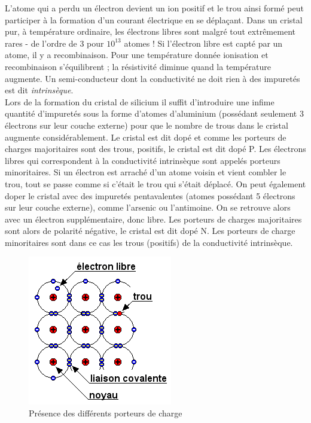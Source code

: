 L'atome qui a perdu un électron devient un ion positif et le trou ainsi formé peut participer à la formation d'un courant électrique en se déplaçant.
Dans un cristal pur, à température ordinaire, les électrons libres sont malgré tout extrêmement rares - de l'ordre de 3 pour $10^{13}$ atomes !
Si l'électron libre est capté par un atome, il y a recombinaison. Pour une température donnée ionisation et recombinaison s'équilibrent ; la résistivité diminue quand la température augmente.
Un semi-conducteur dont la conductivité ne doit rien à des impuretés est dit {\it intrinsèque}.\\

Lors de la formation du cristal de silicium il suffit d'introduire une infime quantité d'impuretés sous la forme d'atomes d'aluminium (possédant seulement 3 électrons sur leur couche externe) pour que le nombre de trous dans le cristal augmente considérablement. Le cristal est dit dopé et comme les porteurs de charges majoritaires sont des trous, positifs, le cristal est dit dopé P. Les électrons libres qui correspondent à la conductivité intrinsèque sont
appelés porteurs minoritaires.
Si un électron est arraché d'un atome voisin et vient combler le trou, tout se passe comme si c'était le trou qui s'était déplacé.
On peut également doper le cristal avec des impuretés pentavalentes (atomes possédant 5 électrons sur leur couche externe),
comme l'arsenic ou l'antimoine. On se retrouve alors avec un électron supplémentaire, donc libre. Les porteurs de charges majoritaires
sont alors de polarité négative, le cristal est dit dopé N. Les porteurs de charge minoritaires sont dans ce cas les trous (positifs)
de la conductivité intrinsèque.\\

\begin{figure}[htb]
\begin{center}
\includegraphics[scale=0.5]{figures/cristal.png}
\caption{Présence des différents porteurs de charge}
\end{center}
\end{figure}

